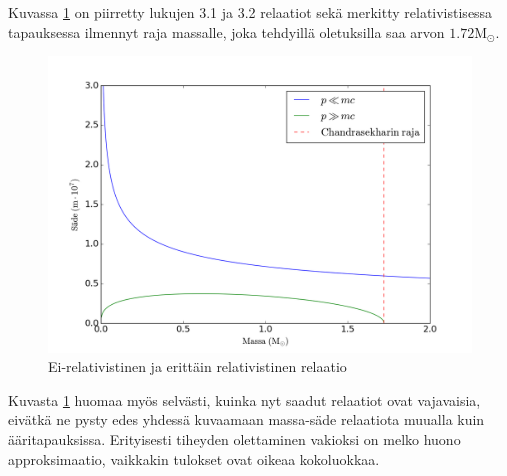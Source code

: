 \documentclass[12pt,a4paper,titlepage]{article}
\begin{document}
Kuvassa \ref{pic:1} on piirretty lukujen 3.1 ja 3.2 relaatiot sekä merkitty relativistisessa tapauksessa ilmennyt raja massalle, joka tehdyillä oletuksilla saa arvon $1.72 \mathrm{M}_{\odot}$.
\begin{figure}[H]
\centering
\includegraphics[width=\textwidth]{mr1.png}
\caption{Ei-relativistinen ja erittäin relativistinen relaatio}
\label{pic:1}
\end{figure}
Kuvasta \ref{pic:1} huomaa myös selvästi, kuinka nyt saadut relaatiot ovat vajavaisia, eivätkä ne pysty edes yhdessä kuvaamaan massa-säde relaatiota muualla kuin ääritapauksissa. Erityisesti tiheyden olettaminen vakioksi on melko huono approksimaatio, vaikkakin tulokset ovat oikeaa kokoluokkaa.
\end{document}

